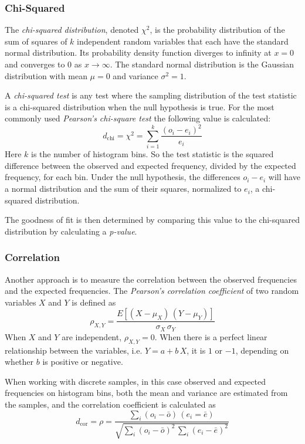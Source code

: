 \subsubsection{Chi-Squared}
The \emph{chi-squared distribution}, denoted $\chi^2$, is the probability distribution of the sum of squares of $k$ independent random variables that each have the standard normal distribution. Its probability density function diverges to infinity at $x = 0$ and converges to $0$ as $x \rightarrow \infty$. The standard normal distribution is the Gaussian distribution with mean $\mu = 0$ and variance $\sigma^2 = 1$.

A \emph{chi-squared test} is any test where the sampling distribution of the test statistic is a chi-squared distribution when the null hypothesis is true. For the most commonly used \emph{Pearson's chi-square test} the following value is calculated:
\begin{equation}
d_{\text{chi}} = \chi^2 = \sum_{i=1}^{k} \frac{(o_i - e_i)^2}{e_i} 
\end{equation}
Here $k$ is the number of histogram bins. So the test statistic is the squared difference between the observed and expected frequency, divided by the expected frequency, for each bin. Under the null hypothesis, the differences $o_i - e_i$ will have a normal distribution and the sum of their squares, normalized to $e_i$, a chi-squared distribution.

The goodness of fit is then determined by comparing this value to the chi-squared distribution by calculating a \emph{p-value}.

\subsubsection{Correlation}
Another approach is to measure the correlation between the observed frequencies and the expected frequencies. The \emph{Pearson's correlation coefficient} of two random variables $X$ and $Y$ is defined as
\begin{equation}
\rho_{X,Y} = \frac{E[(X - \mu_X) \, (Y - \mu_Y)]}{\sigma_X \, \sigma_Y}
\end{equation}
When $X$ and $Y$ are independent, $\rho_{X,Y} = 0$. When there is a perfect linear relationship between the variables, i.e. $Y = a + b \, X$, it is $1$ or $-1$, depending on whether $b$ is positive or negative.

When working with discrete samples, in this case observed and expected frequencies on histogram bins, both the mean and variance are estimated from the samples, and the correlation coefficient is calculated as
\begin{equation}
d_{\text{cor}} = \rho = \frac
{\sum_{i} (o_i - \bar{o}) \, (e_i = \bar{e})}
{\sqrt{ \sum_{i} (o_i - \bar{o})^2 \, \sum_{i} (e_i - \bar{e})^2 }}
\end{equation}


